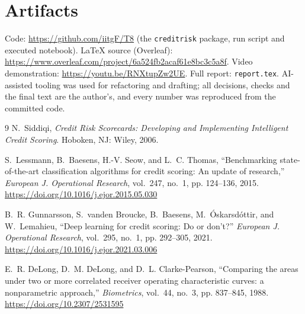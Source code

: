 \documentclass[a4paper,twocolumn,10pt]{article}
\begin{document}
\section{Artifacts}
Code: \url{https://github.com/iitgF/T8} (the \texttt{creditrisk} package, run script and executed notebook). LaTeX source (Overleaf): \url{https://www.overleaf.com/project/6a524fb2acaf61e8bc3c5a8f}. Video demonstration: \url{https://youtu.be/RNXtupZw2UE}. Full report: \texttt{report.tex}. AI-assisted tooling was used for refactoring and drafting; all decisions, checks and the final text are the author's, and every number was reproduced from the committed code.

\begin{thebibliography}{9}
\small
{}
N.~Siddiqi, \textit{Credit Risk Scorecards: Developing and Implementing Intelligent Credit Scoring}. Hoboken, NJ: Wiley, 2006.

S.~Lessmann, B.~Baesens, H.-V. Seow, and L.~C. Thomas, ``Benchmarking state-of-the-art classification algorithms for credit scoring: An update of research,'' \textit{European J. Operational Research}, vol.~247, no.~1, pp. 124--136, 2015. \url{https://doi.org/10.1016/j.ejor.2015.05.030}

B.~R. Gunnarsson, S.~vanden Broucke, B.~Baesens, M.~\'Oskarsd\'ottir, and W.~Lemahieu, ``Deep learning for credit scoring: Do or don't?'' \textit{European J. Operational Research}, vol.~295, no.~1, pp. 292--305, 2021. \url{https://doi.org/10.1016/j.ejor.2021.03.006}

E.~R. DeLong, D.~M. DeLong, and D.~L. Clarke-Pearson, ``Comparing the areas under two or more correlated receiver operating characteristic curves: a nonparametric approach,'' \textit{Biometrics}, vol.~44, no.~3, pp. 837--845, 1988. \url{https://doi.org/10.2307/2531595}
\end{thebibliography}
\end{document}

